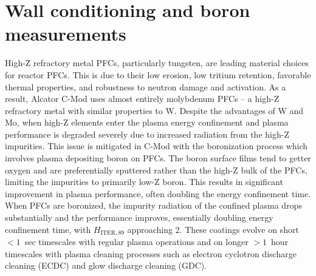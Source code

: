 \documentclass[final,3p,times,twocolumn]{elsarticle}
\begin{document}

\section{Wall conditioning and boron measurements}
\label{sec:BZNOverview}

High-Z refractory metal PFCs, particularly tungsten, are leading material choices for reactor PFCs. This is due to their low erosion, low tritium retention, favorable thermal properties, and robustness to neutron damage and activation. As a result, Alcator C-Mod uses almost entirely molybdenum PFCs -- a high-Z refractory metal with similar properties to W.  Despite the advantages of W and Mo, when high-Z elements enter the plasma energy confinement and plasma performance is degraded severely due to increased radiation from the high-Z impurities. %
This issue is mitigated in C-Mod with the boronization process which involves plasma depositing boron on PFCs. The boron surface films tend to getter oxygen and are preferentially sputtered rather than the high-Z bulk of the PFCs, limiting the impurities to primarily low-Z boron. This results in significant improvement in plasma performance, often doubling the energy confinement time. When PFCs are boronized, the impurity radiation of the confined plasma drops substantially and the performance improves, essentially doubling energy confinement time, with $H_\mathrm{ITER,89}$ approaching 2. These coatings evolve on short $< 1$~sec timescales with regular plasma operations and on longer $>1$~hour timescales with plasma cleaning processes such as electron cyclotron discharge cleaning (ECDC) and glow discharge cleaning (GDC).
\end{document}
